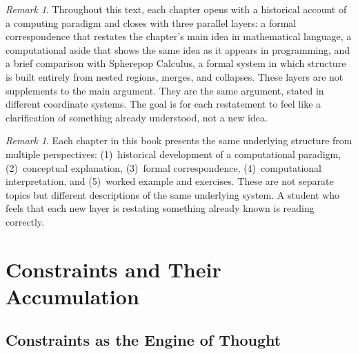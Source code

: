 \documentclass[11pt]{book}
\theoremstyle{plain}
\theoremstyle{definition}
\theoremstyle{remark}
\newtheorem{remark}[theorem]{Remark}
\begin{document}
\begin{remark}
Throughout this text, each chapter opens with a historical account of a
computing paradigm and closes with three parallel layers: a formal
correspondence that restates the chapter's main idea in mathematical
language, a computational aside that shows the same idea as it appears
in programming, and a brief comparison with Spherepop Calculus, a
formal system in which structure is built entirely from nested regions,
merges, and collapses. These layers are not supplements to the main
argument. They are the same argument, stated in different coordinate
systems. The goal is for each restatement to feel like a clarification
of something already understood, not a new idea.
\end{remark}

\mainmatter


\begin{remark}
Each chapter in this book presents the same underlying structure from
multiple perspectives: (1)~historical development of a computational
paradigm, (2)~conceptual explanation, (3)~formal correspondence,
(4)~computational interpretation, and (5)~worked example and exercises.
These are not separate topics but different descriptions of the same
underlying system. A student who feels that each new layer is restating
something already known is reading correctly.
\end{remark}

\part{Constraints and Their Accumulation}

\chapter{Constraints as the Engine of Thought}
\end{document}

